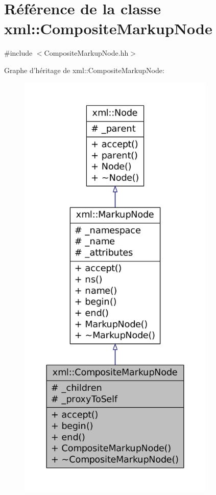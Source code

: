 \hypertarget{classxml_1_1_composite_markup_node}{
\section{Référence de la classe xml::CompositeMarkupNode}
\label{classxml_1_1_composite_markup_node}
}


{\ttfamily \#include $<$CompositeMarkupNode.hh$>$}



Graphe d'héritage de xml::CompositeMarkupNode:\nopagebreak
\begin{figure}[H]
\begin{center}
\leavevmode
\includegraphics[height=600pt]{classxml_1_1_composite_markup_node__inherit__graph}
\end{center}
\end{figure}


